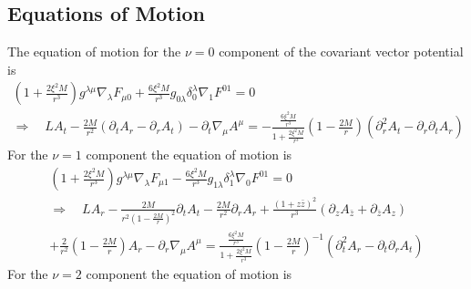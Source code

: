 \documentclass[12pt]{article}
\def\nn{\nonumber}
\begin{document}
\subsection{Equations of Motion}
The equation of motion for the $\nu=0$ component of the covariant vector potential is
\begin{gather}
(1 + \frac{2 \xi^{2} M}{r^{3}} )
g^{\lambda \mu}
\nabla_{\lambda}F_{\mu 0}
+
\frac{6 \xi^{2} M}{r^{3}} 
g_{0 \lambda}
\delta_{0}^{\lambda}
\nabla_{1}F^{0 1}
=0
\nn \\
\Rightarrow
\quad
LA_{t} 
-
\frac{2 M}{r^{2}}
(\partial_{t} A_{r} - \partial_{r} A_{t})
-
\partial_{t}
\nabla_{\mu}
A^{\mu}
=
-
\frac{\frac{6 \xi^{2} M}{r^{3}} }{1 + \frac{2 \xi^{2} M}{r^{3}}}
(1 - \frac{2 M}{r})
(\partial_{r}^{2} A_{t} - \partial_{r} \partial_{t} A_{r})
\end{gather}
For the $\nu=1$ component the equation of motion is
\begin{gather}
(1 + \frac{2 \xi^{2} M}{r^{3}} )
g^{\lambda \mu}
\nabla_{\lambda}F_{\mu 1}
-
\frac{6 \xi^{2} M}{r^{3}} 
g_{1 \lambda}
\delta_{1}^{\lambda}
\nabla_{0}F^{0 1}
=0
\nn \\
\Rightarrow
\quad
L A_{r} 
-
\frac{2 M}{r^{2} (1 - \frac{2 M}{r})^{2}}
\partial_{t} A_{t}
-
\frac{2 M}{r^{2}}
\partial_{r} A_{r}
+
\frac{(1 + z \bar{z})^{2}}{r^{3}}
(\partial_{z} A_{\bar{z}} + \partial_{\bar{z}} A_{z})
\nn \\
+
\frac{2}{r^{2}}
(1 - \frac{2 M}{r})
A_{r}
-
\partial_{r}
\nabla_{\mu}
A^{\mu}
=
\frac{\frac{6 \xi^{2} M}{r^{3}} }{1 + \frac{2 \xi^{2} M}{r^{3}}}
(1 - \frac{2 M}{r})^{-1}
(\partial_{t}^{2} A_{r} - \partial_{t} \partial_{r} A_{t})
\end{gather}
For the $\nu=2$ component the equation of motion is
\end{document}
